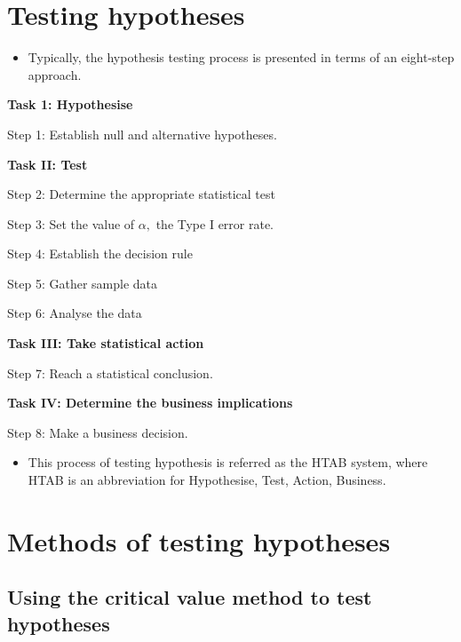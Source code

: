 \documentclass[]{book}
\providecommand{\tightlist}{%
  \setlength{\itemsep}{0pt}\setlength{\parskip}{0pt}}
\begin{document}
\hypertarget{testing-hypotheses}{%
\section{Testing hypotheses}\label{testing-hypotheses}}

\begin{itemize}
\tightlist
\item
  Typically, the hypothesis testing process is presented in terms of an eight-step approach.
\end{itemize}

\textbf{Task 1: Hypothesise}

Step 1: Establish null and alternative hypotheses.

\textbf{Task II: Test}

Step 2: Determine the appropriate statistical test

Step 3: Set the value of \(\alpha,\) the Type I error rate.

Step 4: Establish the decision rule

Step 5: Gather sample data

Step 6: Analyse the data

\textbf{Task III: Take statistical action}

Step 7: Reach a statistical conclusion.

\textbf{Task IV: Determine the business implications}

Step 8: Make a business decision.

\begin{itemize}
\tightlist
\item
  This process of testing hypothesis is referred as the HTAB system, where HTAB is an abbreviation for Hypothesise, Test, Action, Business.
\end{itemize}

\hypertarget{methods-of-testing-hypotheses}{%
\section{Methods of testing hypotheses}\label{methods-of-testing-hypotheses}}

\hypertarget{using-the-critical-value-method-to-test-hypotheses}{%
\subsection{Using the critical value method to test hypotheses}\label{using-the-critical-value-method-to-test-hypotheses}}
\end{document}

